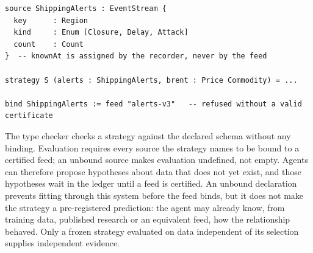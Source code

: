 \documentclass[11pt]{article}
\begin{document}
\begin{lstlisting}
source ShippingAlerts : EventStream {
  key      : Region
  kind     : Enum [Closure, Delay, Attack]
  count    : Count
}  -- knownAt is assigned by the recorder, never by the feed

strategy S (alerts : ShippingAlerts, brent : Price Commodity) = ...

bind ShippingAlerts := feed "alerts-v3"   -- refused without a valid certificate
\end{lstlisting}

The type checker checks a strategy against the declared schema without any binding. Evaluation requires every source the strategy names to be bound to a certified feed; an unbound source makes evaluation undefined, not empty. Agents can therefore propose hypotheses about data that does not yet exist, and those hypotheses wait in the ledger until a feed is certified. An unbound declaration prevents fitting through this system before the feed binds, but it does not make the strategy a pre-registered prediction: the agent may already know, from training data, published research or an equivalent feed, how the relationship behaved. Only a frozen strategy evaluated on data independent of its selection supplies independent evidence.
\end{document}
